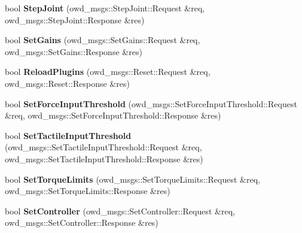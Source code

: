 \begin{DoxyCompactItemize}
\item 
\hypertarget{classOWD_1_1WamDriver_aa5e89be3792a9eadaa6d1543065b58c3}{bool {\bfseries Step\-Joint} (owd\-\_\-msgs\-::\-Step\-Joint\-::\-Request \&req, owd\-\_\-msgs\-::\-Step\-Joint\-::\-Response \&res)}\label{classOWD_1_1WamDriver_aa5e89be3792a9eadaa6d1543065b58c3}

\item 
\hypertarget{classOWD_1_1WamDriver_a3c588d208a0d55b3dc616087d87e0139}{bool {\bfseries Set\-Gains} (owd\-\_\-msgs\-::\-Set\-Gains\-::\-Request \&req, owd\-\_\-msgs\-::\-Set\-Gains\-::\-Response \&res)}\label{classOWD_1_1WamDriver_a3c588d208a0d55b3dc616087d87e0139}

\item 
\hypertarget{classOWD_1_1WamDriver_a25025bae408980b41474368a0fe512d7}{bool {\bfseries Reload\-Plugins} (owd\-\_\-msgs\-::\-Reset\-::\-Request \&req, owd\-\_\-msgs\-::\-Reset\-::\-Response \&res)}\label{classOWD_1_1WamDriver_a25025bae408980b41474368a0fe512d7}

\item 
\hypertarget{classOWD_1_1WamDriver_a3e33441262f75f89d13d7cb9f8f0e664}{bool {\bfseries Set\-Force\-Input\-Threshold} (owd\-\_\-msgs\-::\-Set\-Force\-Input\-Threshold\-::\-Request \&req, owd\-\_\-msgs\-::\-Set\-Force\-Input\-Threshold\-::\-Response \&res)}\label{classOWD_1_1WamDriver_a3e33441262f75f89d13d7cb9f8f0e664}

\item 
\hypertarget{classOWD_1_1WamDriver_af5c04bd7e5abb79caad63ff5fbb6f68c}{bool {\bfseries Set\-Tactile\-Input\-Threshold} (owd\-\_\-msgs\-::\-Set\-Tactile\-Input\-Threshold\-::\-Request \&req, owd\-\_\-msgs\-::\-Set\-Tactile\-Input\-Threshold\-::\-Response \&res)}\label{classOWD_1_1WamDriver_af5c04bd7e5abb79caad63ff5fbb6f68c}

\item 
\hypertarget{classOWD_1_1WamDriver_a391ce38d935749644494c9e4d4b4d07a}{bool {\bfseries Set\-Torque\-Limits} (owd\-\_\-msgs\-::\-Set\-Torque\-Limits\-::\-Request \&req, owd\-\_\-msgs\-::\-Set\-Torque\-Limits\-::\-Response \&res)}\label{classOWD_1_1WamDriver_a391ce38d935749644494c9e4d4b4d07a}

\item 
\hypertarget{classOWD_1_1WamDriver_a86a5f43f37f78088bf7b7ae28e069a7b}{bool {\bfseries Set\-Controller} (owd\-\_\-msgs\-::\-Set\-Controller\-::\-Request \&req, owd\-\_\-msgs\-::\-Set\-Controller\-::\-Response \&res)}\label{classOWD_1_1WamDriver_a86a5f43f37f78088bf7b7ae28e069a7b}


\end{DoxyCompactItemize}

